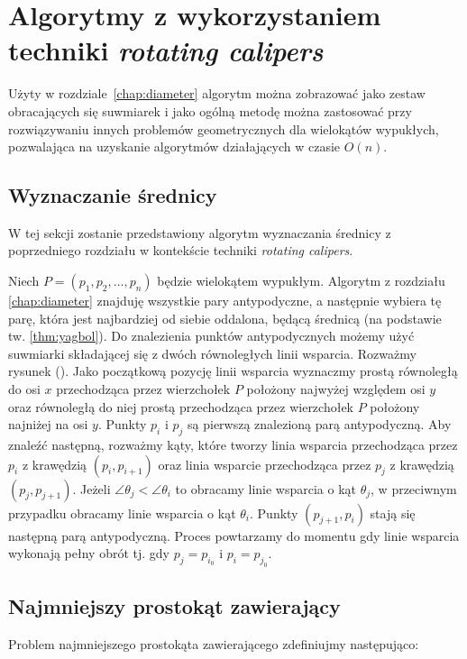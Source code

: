 \chapter{Algorytmy z wykorzystaniem techniki \emph{rotating calipers}\label{chap:calipers}}
Użyty w rozdziale~\ref{chap:diameter} algorytm można zobrazować jako
zestaw obracających się suwmiarek i jako ogólną metodę można
zastosować przy rozwiązywaniu innych problemów geometrycznych dla
wielokątów wypukłych, pozwalająca na uzyskanie algorytmów działających
w czasie $O(n)$.

\section{Wyznaczanie średnicy}
W tej sekcji zostanie przedstawiony algorytm wyznaczania średnicy z
poprzedniego rozdziału w kontekście techniki \emph{rotating calipers}.

Niech $P = (p_1, p_2, \ldots, p_n)$ będzie wielokątem
wypukłym. Algorytm z rozdziału \ref{chap:diameter} znajduję wszystkie
pary antypodyczne, a następnie wybiera tę parę, która jest najbardziej
od siebie oddalona, będącą średnicą (na podstawie
tw. \ref{thm:yagbol}). Do znalezienia punktów antypodycznych możemy
użyć suwmiarki składającej się z dwóch równoległych linii
wsparcia. Rozważmy rysunek (). Jako początkową pozycję linii wsparcia
wyznaczmy prostą równoległą do osi $x$ przechodząca przez wierzchołek
$P$ położony najwyżej względem osi $y$ oraz równoległą do niej prostą
przechodząca przez wierzchołek $P$ położony najniżej na osi
$y$. Punkty $p_i$ i $p_j$ są pierwszą znalezioną parą
antypodyczną. Aby znaleźć następną, rozważmy kąty, które tworzy linia
wsparcia przechodząca przez $p_i$ z krawędzią $(p_i, p_{i+1})$ oraz
linia wsparcie przechodząca przez $p_j$ z krawędzią $(p_j, p_{j+1})$.
Jeżeli $\angle{\theta_j} < \angle{\theta_i}$ to obracamy linie
wsparcia o kąt $\theta_j$, w przeciwnym przypadku obracamy linie
wsparcia o kąt $\theta_i$. Punkty $(p_{j+1}, p_i)$ stają się następną
parą antypodyczną. Proces powtarzamy do momentu gdy linie wsparcia
wykonają pełny obrót tj. gdy $p_j = p_{i_0}$ i $p_i = p_{j_0}$.



\section{Najmniejszy prostokąt zawierający}
Problem najmniejszego prostokąta zawierającego zdefiniujmy
następująco:

